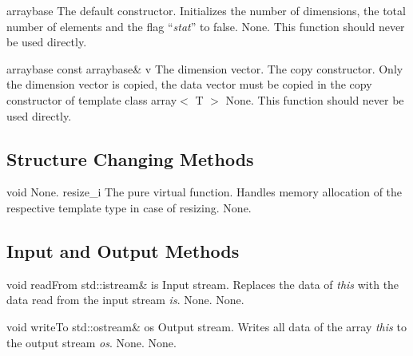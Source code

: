 \setNormalInstance
\printEmptyMethodReturnSpecial
{}
{arraybase}
{The default constructor. Initializes the number of dimensions, the
total number of elements and the flag ``{\em stat}'' to false.}
{None.}
{This function should never be used directly.}
\setCorrectWidthThree{4pt}

\setNormalInstance
\printMethodWithOneParam
{}
{arraybase}
{const arraybase\&}
{v}
{The dimension vector.}
{The copy constructor. Only the dimension vector is copied, the data
vector must be copied in the copy constructor of template class
array$<$ T $>$}
{None.}
{This function should never be used directly.}

\vspace*{10mm}

\subsection{Structure Changing Methods}

\setNormalInstance
\setCorrectWidthThree{8pt}
\printMethodWithParamsSaved
{void}
{None.}
{resize\_i}
{The pure virtual function. Handles memory allocation of the
respective template type in case of resizing.}
{None.}
\setCorrectWidthThree{4pt}

\vspace*{10mm}

\subsection{Input and Output Methods}

\setNormalInstance
\printMethodWithOneParam
{void}
{readFrom}
{std::istream\&}
{is}
{Input stream.}
{Replaces the data of {\em this} with the data read from the input stream
{\em is}.}
{None.}
{None.}

\setConstInstance
\printMethodWithOneParam
{void}
{writeTo}
{std::ostream\&}
{os}
{Output stream.}
{Writes all data of the array {\em this} to the output stream {\em os}.}
{None.}
{None.}




